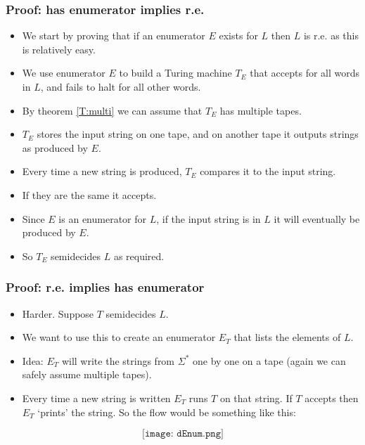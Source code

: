 \documentclass[handout]{beamer}
\begin{document}
\begin{frame}
\frametitle{Proof: has enumerator implies r.e.}
\begin{itemize}
\item We start by proving that if an enumerator $E$ exists for $L$ then $L$ is r.e. as this is relatively easy. 
\vspace{0.2cm}
\item We use enumerator $E$ to build a Turing machine $T_E$ that accepts for all words in $L$, and fails to halt for all other words.
\vspace{0.2cm}
\item By theorem \ref{T:multi} we can assume that $T_E$ has multiple tapes.
\vspace{0.2cm}
\item $T_E$ stores the input string on one tape, and on another tape it outputs strings as produced by $E$. 
\vspace{0.2cm}
\item Every time a new string is produced, $T_E$ compares it to the input string.
\vspace{0.2cm} 
\item If they are the same it accepts. 
\vspace{0.2cm}
\item Since $E$ is an enumerator for $L$, if the input string is in $L$ it will eventually be produced by $E$. 
\vspace{0.2cm}
\item So $T_E$ semidecides $L$ as required.
\end{itemize}
\end{frame}

\begin{frame}
\frametitle{Proof: r.e. implies has enumerator}
\begin{itemize}
\item Harder. Suppose $T$ semidecides $L$.
\vspace{0.2cm}
\item We want to use this to create an enumerator $E_T$ that lists the elements of $L$. 
\vspace{0.2cm}
\item Idea: $E_T$ will write the strings from $\Sigma^*$ one by one on a tape (again we can safely assume multiple tapes). 
\vspace{0.2cm}
\item Every time a new string is written $E_T$ runs $T$ on that string. If $T$ accepts then $E_T$ `prints' the string. So the flow would be something like this:
\end{itemize}
\[\texttt{[image: dEnum.png]} \]  
\end{frame}
\end{document}
